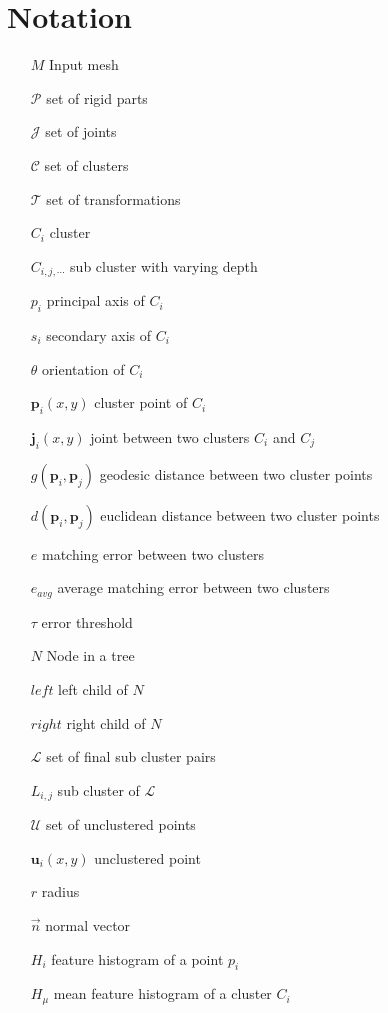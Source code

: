 \chapter*{Notation}
\label{cha:Notation}

\begin{itemize}
	\item[$M$] Input mesh
	\item[$\mathcal{P}$] set of rigid parts
	\item[$\mathcal{J}$] set of joints
	\item[$\mathcal{C}$] set of clusters
	\item[$\mathcal{T}$] set of transformations
	\item[$C_i$] cluster
	\item[$C_{i,j,\cdots}$] sub cluster with varying depth
	\item[$p_i$] principal axis of $C_i$
	\item[$s_i$] secondary axis of $C_i$
	\item[$\theta$] orientation of $C_i$
	\item[$\boldsymbol{p}_i(x,y)$] cluster point of $C_i$
	\item[$\boldsymbol{j}_i(x,y)$] joint between two clusters $C_i$ and $C_j$
	\item[$g(\boldsymbol{p}_i,\boldsymbol{p}_j)$] geodesic distance between two cluster points
	\item[$d(\boldsymbol{p}_i,\boldsymbol{p}_j)$] euclidean distance between two cluster points
	\item[$e$] matching error between two clusters
	\item[$e_{avg}$] average matching error between two clusters 
	\item[$\tau$] error threshold 
	\item[$N$] Node in a tree
	\item[$\mathit{left}$] left child of $N$
	\item[$\mathit{right}$] right child of $N$
	\item[$\mathcal{L}$] set of final sub cluster pairs
	\item[$L_{i,j}$] sub cluster of $\mathcal{L}$	
	\item[$\mathcal{U}$] set of unclustered points
	\item[$\boldsymbol{u}_i(x,y)$] unclustered point
	\item[$r$] radius
	\item[$\vec{n}$] normal vector
	\item[$H_i$] feature histogram of a point $p_i$
	\item[$H_\mu$] mean feature histogram of a cluster $C_i$
\end{itemize}


